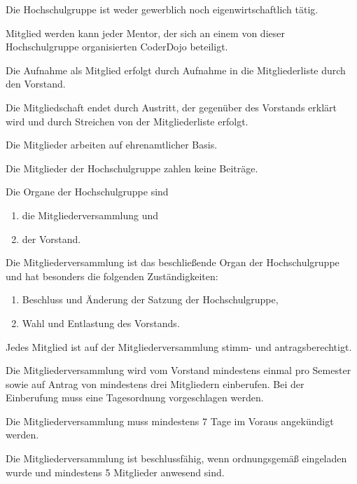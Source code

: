 \documentclass[a4paper, parskip=half, numbers=noenddot]{scrartcl}
\begin{document}
\begin{contract}
Die Hochschulgruppe ist weder gewerblich noch eigenwirtschaftlich tätig.


%
%

%

Mitglied werden kann jeder Mentor, der sich an einem von dieser Hochschulgruppe
organisierten CoderDojo beteiligt.

Die Aufnahme als Mitglied erfolgt durch Aufnahme in die Mitgliederliste durch
den Vorstand.

Die Mitgliedschaft endet durch Austritt, der gegenüber des Vorstands erklärt wird
und durch Streichen von der Mitgliederliste erfolgt.

Die Mitglieder arbeiten auf ehrenamtlicher Basis.

Die Mitglieder der Hochschulgruppe zahlen keine Beiträge.

%
%


Die Organe der Hochschulgruppe sind

  \begin{enumerate}
  \item die Mitgliederversammlung und
  \item der Vorstand.
  \end{enumerate}


%
%

%

Die Mitgliederversammlung ist das beschließende Organ der Hochschulgruppe und hat besonders die folgenden Zuständigkeiten:
\begin{enumerate}
\item Beschluss und Änderung der Satzung der Hochschulgruppe,
\item Wahl und Entlastung des Vorstands.
\end{enumerate}

Jedes Mitglied ist auf der Mitgliederversammlung stimm- und antragsberechtigt.

Die Mitgliederversammlung wird vom Vorstand mindestens einmal pro Semester sowie auf Antrag von mindestens drei Mitgliedern einberufen. Bei der Einberufung muss eine Tagesordnung vorgeschlagen werden.

Die Mitgliederversammlung muss mindestens 7 Tage im Voraus angekündigt werden.

Die Mitgliederversammlung ist beschlussfähig, wenn ordnungsgemäß eingeladen wurde und mindestens 5 Mitglieder anwesend sind.


\end{contract}
\end{document}
